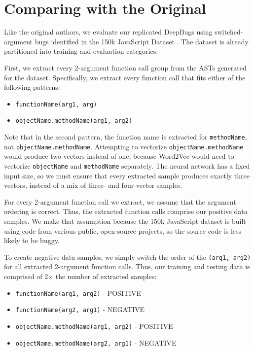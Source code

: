 \section{Comparing with the Original}
\label{sec:evaluating-deepbugs}

Like the original authors, we evaluate our replicated DeepBugs using switched-argument bugs identified in the 150k JavaScript Dataset \cite{raychev_learning_2016}. The dataset is already partitioned into training and evaluation categories.

First, we extract every 2-argument function call group from the ASTs generated for the dataset. Specifically, we extract every function call that fits either of the following patterns:

\begin{itemize}
    \item \texttt{functionName(arg1, arg)}
    \item \texttt{objectName.methodName(arg1, arg2)}
\end{itemize}

Note that in the second pattern, the function name is extracted for \texttt{methodName}, not \texttt{objectName.methodName}. Attempting to vectorize \texttt{objectName.methodName} would produce two vectors instead of one, because Word2Vec would need to vectorize \texttt{objectName} and \texttt{methodName} separately. The neural network has a fixed input size, so we must ensure that every extracted sample produces exactly three vectors, instead of a mix of three- and four-vector samples.

For every 2-argument function call we extract, we assume that the argument ordering is correct. Thus, the extracted function calls comprise our positive data samples. We make that assumption because the 150k JavaScript dataset is built using code from various public, open-source projects, so the source code is less likely to be buggy.

To create negative data samples, we simply switch the order of the \texttt{(arg1, arg2)} for all extracted 2-argument function calls. Thus, our training and testing data is comprised of 2$\times$ the number of extracted samples:

\begin{itemize}
    \item \texttt{functionName(arg1, arg2)} - POSITIVE
    \item \texttt{functionName(arg2, arg1)} - NEGATIVE
    \item \texttt{objectName.methodName(arg1, arg2)} - POSITIVE
    \item \texttt{objectName.methodName(arg2, arg1)} - NEGATIVE
\end{itemize}

